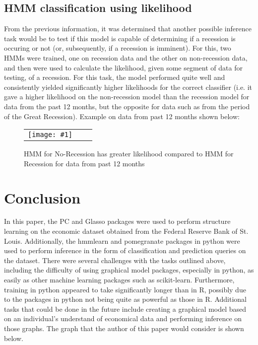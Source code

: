 \documentclass{article}
\begin{document}
\subsection{HMM classification using likelihood}
From the previous information, it was determined that another possible inference task would be to test if this model is capable of determining if a recession is occuring or not (or, subsequently, if a recession is imminent). For this, two HMMs were trained, one on recession data and the other on non-recession data, and then were used to calculate the likelihood, given some segment of data for testing, of a recession. For this task, the model performed quite well and consistently yielded significantly higher likelihoods for the correct classifier (i.e. it gave a higher likelihood on the non-recession model than the recession model for data from the past 12 months, but the opposite for data such as from the period of the Great Recession). Example on data from past 12 months shown below:


\begin{figure*}[ht]
   \centering

\newcommand{\photo}[1]{%
    \texttt{[image: \#1]}
}

\begin{tabular}{rcc}
    \photo{HMM_Recession} \\
\end{tabular}
	\caption{HMM for No-Recession has greater likelihood compared to HMM for Recession for data from past 12 months}
\end{figure*}


\section{Conclusion}
In this paper, the PC and Glasso packages were used to perform structure learning on the economic dataset obtained from the  Federal Reserve Bank of St. Louis. Additionally, the hmmlearn and pomegranate packages in python were used to perform inference in the form of classification and prediction queries on the dataset. There were several challenges with the tasks outlined above, including the difficulty of using graphical model packages, especially in python, as easily as other machine learning packages such as scikit-learn. Furthermore, training in python appeared to take significantly longer than in R, possibly due to the packages in python not being quite as powerful as those in R.  Additional tasks that could be done in the future include creating a graphical model based on an individual's understand of economical data and performing inference on those graphs. The graph that the author of this paper would consider is shown below.
\end{document}
